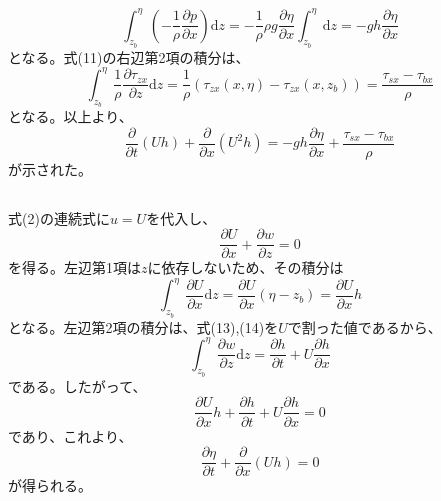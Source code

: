 \documentclass[a4paper]{jsarticle}
\begin{document}
\begin{equation}
  \int_{z_b}^{\eta} \left(-\frac{1}{\rho} \frac{\partial p}{\partial x}\right) \mathrm{d} z
  = -\frac{1}{\rho} \rho g \frac{\partial \eta}{\partial x} \int_{z_b}^{\eta} \mathrm{d} z
  = -g h \frac{\partial \eta}{\partial x}
\end{equation}
となる。式(11)の右辺第2項の積分は、
\begin{equation}
  \int_{z_b}^{\eta} \frac{1}{\rho} \frac{\partial \tau_{zx}}{\partial z} \mathrm{d} z
  = \frac{1}{\rho} \left(\tau_{zx}(x, \eta) - \tau_{zx}(x, z_b)\right)
  = \frac{\tau_{sx} - \tau_{bx}}{\rho}
\end{equation}
となる。以上より、
\begin{equation}
  \frac{\partial}{\partial t} (U h) + \frac{\partial}{\partial x} (U^2 h)
  = -g h \frac{\partial \eta}{\partial x} + \frac{\tau_{sx} - \tau_{bx}}{\rho}
\end{equation}
が示された。

\subsection{}
式(2)の連続式に$u = U$を代入し、
\begin{equation}
  \frac{\partial U}{\partial x} + \frac{\partial w}{\partial z} = 0
\end{equation}
を得る。左辺第1項は$z$に依存しないため、その積分は
\begin{equation}
  \int_{z_b}^{\eta} \frac{\partial U}{\partial x} \mathrm{d} z
  = \frac{\partial U}{\partial x} (\eta - z_b)
  = \frac{\partial U}{\partial x} h
\end{equation}
となる。左辺第2項の積分は、式(13),(14)を$U$で割った値であるから、
\begin{equation}
  \int_{z_b}^{\eta} \frac{\partial w}{\partial z} \mathrm{d} z
  = \frac{\partial h}{\partial t} + U \frac{\partial h}{\partial x}
\end{equation}
である。したがって、
\begin{equation}
  \frac{\partial U}{\partial x} h + \frac{\partial h}{\partial t} + U \frac{\partial h}{\partial x} = 0
\end{equation}
であり、これより、
\begin{equation}
  \frac{\partial \eta}{\partial t} + \frac{\partial}{\partial x} (Uh) = 0
\end{equation}
が得られる。
\end{document}
